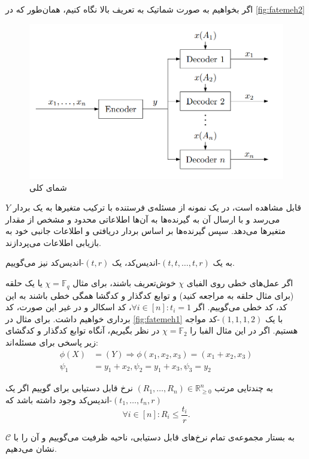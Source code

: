 اگر بخواهیم به صورت شماتیک به تعریف بالا نگاه کنیم، همان‌طور که در
\autoref{fig:fatemeh2}
\begin{figure}
	\centering
	\includegraphics[width=0.7\linewidth]{figs/chapter1/fatemeh2}
	\caption[
		شمای کلی 
	\icod
	]{
		شمای کلی 
		\icod
	\cite{fatemehbook}\footnotemark
	}
	\label{fig:fatemeh2}
\end{figure}
قابل مشاهده است، در یک نمونه از مسئله‌ی
\icod
فرستنده با ترکیب متغیرها به یک بردار
$Y$
می‌رسد و با ارسال آن به گیرنده‌ها به آن‌ها اطلاعاتی محدود و مشخص از مقدار متغیرها می‌دهد. سپس گیرنده‌ها بر اساس بردار دریافتی و اطلاعات جانبی خود به بازیابی اطلاعات می‌پردازند.

	به یک
	$(t, t, \ldots, t, r)$-اندیس‌کد،
	یک
	$(t, r)$-اندیس‌کد
	نیز می‌گوییم.
	
	اگر عمل‌های خطی روی الفبای
	$\chi$
	خوش‌تعریف باشند، برای مثال
	$\chi = \mathbb{F}_q$
	یا یک حلقه (برای مثال حلقه به 
	\cite{Connelly2018}
	مراجعه کنید) و توابع کدگذار و کدگشا همگی خطی باشند به این کد، کد خطی می‌گوییم. اگر 
	$\forall i \in [n]: t_i = 1$،
	کد اسکالر و در غیر این‌ صورت، کد برداری خواهیم داشت. برای مثال در 
	\autoref{fig:fatemeh1}
	با یک 
	$(1, 1, 1, 2)$-کد
	مواجه هستیم. اگر در این مثال الفبا را
	$\chi = \mathbb{F}_2$
	در نظر بگیریم، آنگاه توابع کدگذار و کدگشای زیر پاسخی برای مسئله‌اند:
	\begin{align*}
	\phi(X) &= (Y) \Rightarrow \phi(x_1, x_2, x_3) = (x_1 + x_2, x_3) \\
	\psi_1 &= y_1 + x_2, \psi_2 = y_1 + x_3, \psi_3 = y_2
	\end{align*}
	\begin{definition}
		به چندتایی مرتب
		$(R_1, \ldots, R_n) \in \mathbb{R}_{\geqslant 0}^n$
		نرخ قابل دستیابی برای \icod گوییم اگر یک 
		$(t_1, \ldots, t_n, r)$-اندیس‌کد
		 وجود داشته باشد که
		$$\forall i \in [n]: R_i \leq \frac{t_i}{r}.$$
		\end{definition}
  \begin{definition}
  	به بستار مجموعه‌ی تمام نرخ‌های قابل دستیابی، ناحیه ظرفیت می‌گوییم و آن را با
		$\mathscr{C}$
		نشان می‌دهیم.
	\end{definition}
	
